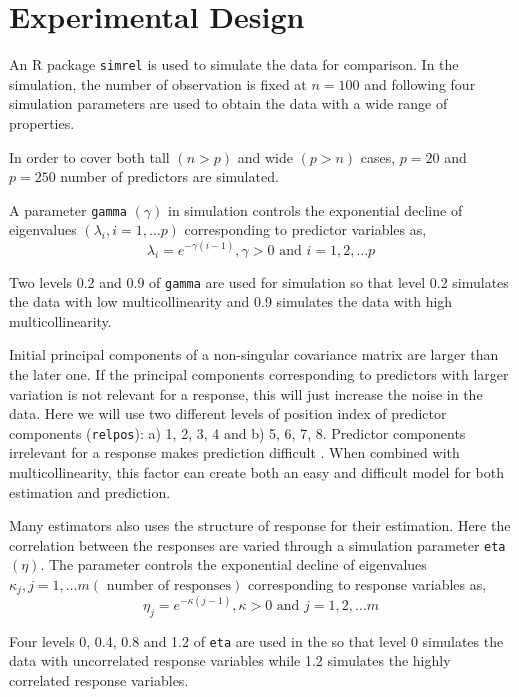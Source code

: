 \documentclass[12pt,3p,authoryear]{elsarticle}
\providecommand{\tightlist}{%
  \setlength{\itemsep}{0pt}\setlength{\parskip}{0pt}}
\begin{document}
\hypertarget{experimental-design}{%
\section{Experimental Design}\label{experimental-design}}

An R \citep{coreR2018} package \texttt{simrel} \citep{Rimal2018, saebo2015simrel} is used to simulate the data for comparison. In the simulation, the number of observation is fixed at \(n = 100\) and following four simulation parameters are used to obtain the data with a wide range of properties.

\begin{description}
\tightlist
\item[\textbf{Number of predictors: (\texttt{p})}]
In order to cover both tall \((n>p)\) and wide \((p>n)\) cases, \(p= 20\) and \(p= 250\) number of predictors are simulated.
\item[\textbf{Multicollinearity in predictor variables: (\texttt{gamma})}]
A parameter \texttt{gamma} \((\gamma)\) in simulation controls the exponential decline of eigenvalues \((\lambda_i, i = 1, \ldots p)\) corresponding to predictor variables as,
\begin{equation}
  \lambda_i = e^{-\gamma(i-1)}, \gamma > 0 \text{ and } i = 1, 2, \ldots p
  \label{eq:gamma}
  \end{equation}

Two levels 0.2 and 0.9 of \texttt{gamma} are used for simulation so that level 0.2 simulates the data with low multicollinearity and 0.9 simulates the data with high multicollinearity.
\item[\textbf{Position of relevant components: (\texttt{relpos})}]
Initial principal components of a non-singular covariance matrix are larger than the later one. If the principal components corresponding to predictors with larger variation is not relevant for a response, this will just increase the noise in the data. Here we will use two different levels of position index of predictor components (\texttt{relpos}): a) 1, 2, 3, 4 and b) 5, 6, 7, 8. Predictor components irrelevant for a response makes prediction difficult \citep{Helland1994b}. When combined with multicollinearity, this factor can create both an easy and difficult model for both estimation and prediction.
\item[\textbf{Correlation in response variables: (\texttt{eta})}]
Many estimators also uses the structure of response for their estimation. Here the correlation between the responses are varied through a simulation parameter \texttt{eta} \((\eta)\). The parameter controls the exponential decline of eigenvalues \(\kappa_j, j = 1, \ldots m (\text{ number of responses})\) corresponding to response variables as,
\begin{equation}
\eta_j = e^{-\kappa(j-1)}, \kappa > 0 \text{ and } j = 1, 2, \ldots m
\label{eq:eta}
\end{equation}

Four levels 0, 0.4, 0.8 and 1.2 of \texttt{eta} are used in the so that level 0 simulates the data with uncorrelated response variables while 1.2 simulates the highly correlated response variables.
\end{description}
\end{document}
